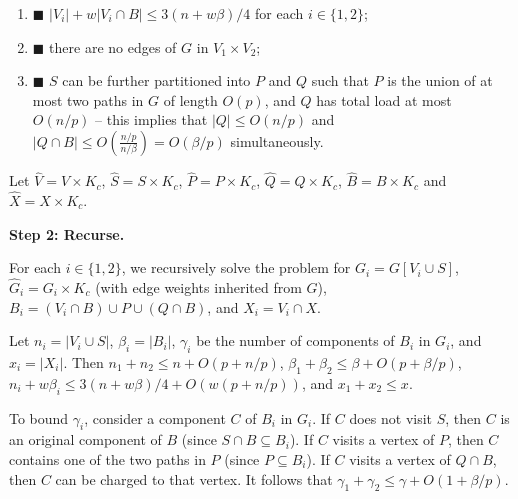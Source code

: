 \documentclass[10pt,a4paper]{article}
\begin{document}
\begin{enumerate}
\item[]  $\blacksquare$ 
$|V_{i}|+w|V_{i}\cap B|\leq 3(n+w\beta)/4$ for each $i\in\{1,2\}$;
\par
\par
\item[]  $\blacksquare$ 
there are no edges of $G$ in $V_{1}\times V_{2}$;
\par
\par
\item[]  $\blacksquare$ 
$S$ can be further partitioned into $P$ and $Q$ such that $P$ is the union of at most two paths in $G$ of length $O(p)$, and $Q$ has total load at most $O(n/p)$ – this implies that $|Q|\leq O(n/p)$ and $|Q\cap B|\leq O(\frac{n/p}{n/\beta})=O(\beta/p)$ simultaneously.
\par
\par
\end{enumerate}
Let $\widehat{V}=V\times K_{c}$, $\widehat{S}=S\times K_{c}$, $\widehat{P}=P\times K_{c}$, $\widehat{Q}=Q\times K_{c}$, $\widehat{B}=B\times K_{c}$ and $\widehat{X}=X\times K_{c}$.
\par
\par
\par\medskip\noindent\textbf{Step 2: Recurse.}\par
For each $i\in\{1,2\}$, we recursively solve the problem for $G_{i}=G[V_{i}\cup S]$, ${\widehat{G}}_{i}=G_{i}\times K_{c}$ (with edge weights inherited from ${\widehat{G}}$), $B_{i}=(V_{i}\cap B)\cup P\cup(Q\cap B)$, and $X_{i}=V_{i}\cap X$.
\par
\par
Let $n_{i}=|V_{i}\cup S|$, $\beta_{i}=|B_{i}|$, $\gamma_{i}$ be the number of components of $B_{i}$ in $G_{i}$, and $x_{i}=|X_{i}|$. Then $n_{1}+n_{2}\leq n+O(p+n/p)$, $\beta_{1}+\beta_{2}\leq\beta+O(p+\beta/p)$, $n_{i}+w\beta_{i}\leq 3(n+w\beta)/4+O(w(p+n/p))$, and $x_{1}+x_{2}\leq x$.
\par
\par
To bound $\gamma_{i}$, consider a component $C$ of $B_{i}$ in $G_{i}$. If $C$ does not visit $S$, then $C$ is an original component of $B$ (since $S\cap B\subseteq B_{i}$). If $C$ visits a vertex of $P$, then $C$ contains one of the two paths in $P$ (since $P\subseteq B_{i}$). If $C$ visits a vertex of $Q\cap B$, then $C$ can be charged to that vertex. It follows that $\gamma_{1}+\gamma_{2}\leq\gamma+O(1+\beta/p)$.
\end{document}

